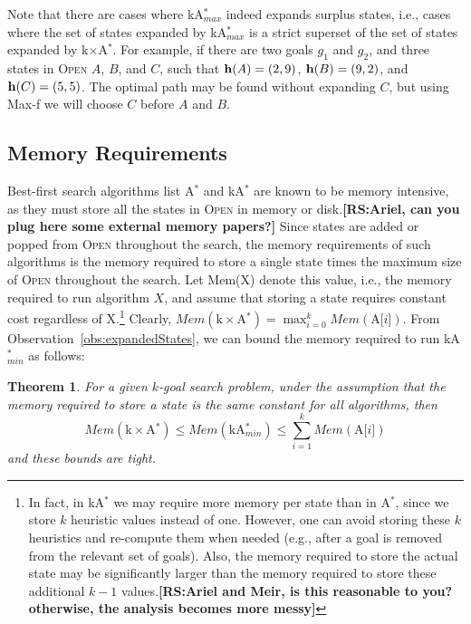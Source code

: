 \documentclass{aicom2e}
\newtheorem{theorem}{Theorem}
\newcommand{\kgs}{$k$-goal search}
\newcommand{\astar}{A$^*$}
\newcommand{\kastar}{kA$^*$}
\newcommand{\kastarmin}{kA$^*_{min}$}
\newcommand{\kastarmax}{kA$^*_{max}$}
\newcommand{\kxastar}{k$\times$A$^*$}
\newcommand{\astari}[1]{A[$#1$]}
\newcommand{\maxf}{Max-f}
\newcommand{\open}{\textsc{Open}}
\newcommand{\roni}[1]{\textbf{[RS:#1]}}
\begin{document}
Note that there are cases where \kastarmax{} indeed expands surplus states, i.e., cases where the set of states expanded by \kastarmax{} is a strict superset of the set of states expanded by \kxastar{}. 
For example, if there are two goals $g_1$ and $g_2$, and three states in \open{} $A$, $B$, and $C$, 
such that ${\bf h}(A)=(2,9)$, ${\bf h}(B)=(9,2)$, and ${\bf h}(C)=(5,5)$. The optimal path may be found without expanding $C$, 
but using \maxf{} we will choose $C$ before $A$ and $B$. 


\subsection{Memory Requirements}
Best-first search algorithms list \astar{} and \kastar{} are known to be memory intensive, 
as they must store all the states in \open{} in memory or disk.\roni{Ariel, can you plug here some external memory papers?} 
Since states are added or popped from \open{} throughout the search, the memory requirements of such algorithms
is the memory required to store a single state times the maximum size of \open{} throughout the search. 
Let Mem(X) denote this value, i.e., the memory required to run algorithm $X$, and assume that storing a state requires constant cost regardless of X.\footnote{In fact, in \kastar{} we may require more memory per state than in \astar{}, since we store $k$ heuristic values instead of one. However, one can avoid storing these $k$ heuristics and re-compute them when needed (e.g., after a goal is removed from the relevant set of goals). Also, the memory required to store the actual state may be significantly larger than the memory required to store these additional $k-1$ values.\roni{Ariel and Meir, is this reasonable to you? otherwise, the analysis becomes more messy}} 
Clearly, $Mem(\text{\kxastar{}})=\max_{i=0}^k Mem(\text{\astari{i}})$. 
From Observation~\ref{obs:expandedStates}, we can bound the memory required
to run \kastarmin{} as follows:  
\begin{theorem}
For a given \kgs{} problem, under the assumption that the memory required to store a state is the same constant for all algorithms, then
\[ Mem(\text{\kxastar{}})\leq Mem(\text{\kastarmin})\leq \sum_{i=1}^k Mem(\text{\astari{i}}) \]	
and these bounds are tight. 
\label{the:memory}
\end{theorem}
\end{document}
